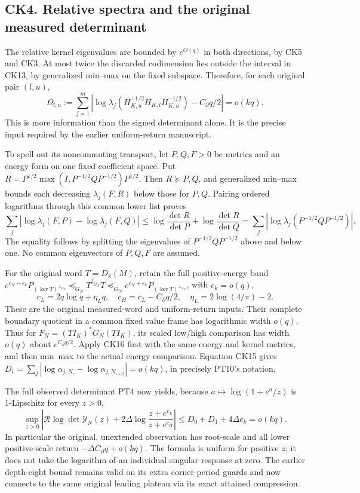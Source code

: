 \documentclass[10pt]{article}
\begin{document}
\subsection{CK4. Relative spectra and the original measured determinant}\label{ck4.-relative-spectra-and-the-original-measured-determinant}

The relative kernel eigenvalues are bounded by \(e^{O(q)}\) in both directions, by CK5 and CK3. At most twice the discarded codimension lies outside the interval in CK13, by generalized min--max on the fixed subspace. Therefore, for each original pair \((l,u)\), \[
 \Omega_{l,u}:=\sum_{j=1}^m\left|\log\lambda_j(H_{K,u}^{-1/2}H_{K,l}H_{K,u}^{-1/2})
 -C_\partial q/2\right|=o(kq).
 \tag{CK15}
\] This is more information than the signed determinant alone. It is the precise input required by the earlier uniform-return manuscript.

To spell out its noncommuting transport, let \(P,Q,F>0\) be metrics and an energy form on one fixed coefficient space. Put \(R=P^{1/2}\max(I,P^{-1/2}QP^{-1/2})P^{1/2}\). Then \(R\succeq P,Q\), and generalized min--max bounds each decreasing \(\lambda_j(F,R)\) below those for \(P,Q\). Pairing ordered logarithms through this common lower list proves \[
 \sum_j|\log\lambda_j(F,P)-\log\lambda_j(F,Q)|
 \le\log\frac{\det R}{\det P}+\log\frac{\det R}{\det Q}
 =\sum_j|\log\lambda_j(P^{-1/2}QP^{-1/2})|.
 \tag{CK16}
\] The equality follows by splitting the eigenvalues of \(P^{-1/2}QP^{-1/2}\) above and below one. No common eigenvectors of \(P,Q,F\) are assumed.

For the original word \(T=D_k(M)\), retain the full positive-energy band \(e^{c_N-e_k}P_{(\ker T)^{\perp_{G_N}}}\preceq_{G_N}T^{\dagger_{G_N}}T\preceq_{G_N}e^{c_N+e_k}P_{(\ker T)^{\perp_{G_N}}}\), with \(e_k=o(q)\), \[
 c_L=2q\log q+\eta_Lq,\quad c_H=c_L-C_\partial q/2,
 \quad\eta_L=2\log(4/\pi)-2.
 \tag{CK17}
\] These are the original measured-word and uniform-return inputs. Their complete boundary quotient in a common fixed value frame has logarithmic width \(o(q)\). Thus for \(F_N=(TI_K)^*G_N(TI_K)\), its scaled low/high comparison has width \(o(q)\) about \(e^{C_\partial q/2}\). Apply CK16 first with the same energy and kernel metrics, and then min--max to the actual energy comparison. Equation CK15 gives \(D_i=\sum_j|\log\alpha_{j,N_i}-\log\alpha_{j,N_{i+2}}|=o(kq)\), in precisely PT10's notation.

The full observed determinant PT4 now yields, because \(a\mapsto\log(1+e^a/z)\) is 1-Lipschitz for every \(z>0\), \[
 \boxed{\sup_{z>0}\left|\mathcal R\log\det\mathscr Y_N(z)
 +2\Delta\log\frac{z+e^{c_L}}{z+e^{c_H}}\right|
 \le D_0+D_1+4\Delta e_k=o(kq).}
 \tag{CK18}
\] In particular the original, unextended observation has root-scale and all lower positive-scale return \(-\Delta C_\partial q+o(kq)\). The formula is uniform for positive \(z\); it does not take the logarithm of an individual singular response at zero. The earlier depth-eight bound remains valid on its extra corner-period guards and now connects to the same original leading plateau via its exact attained compression.
\end{document}
